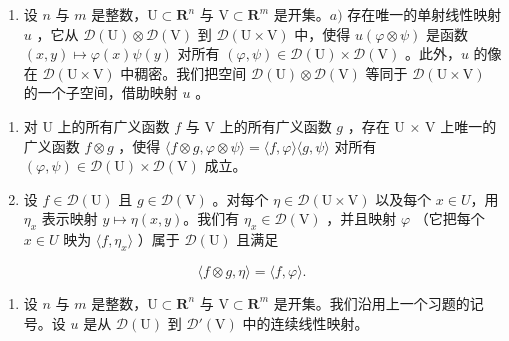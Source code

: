 \begin{enumerate}
\def\labelenumi{\arabic{enumi})}
\setcounter{enumi}{27}
\tightlist
\item
  设 \(n\) 与 \(m\) 是整数，\(\mathrm{U} \subset \mathbf{R}^n\) 与 \(\mathrm{V} \subset \mathbf{R}^m\) 是开集。\(a)\) 存在唯一的单射线性映射 \(u\) ，它从 \(\mathcal{D}(\mathrm{U}) \otimes \mathcal{D}(\mathrm{V})\) 到 \(\mathcal{D}(\mathrm{U} \times \mathrm{V})\) 中，使得 \(u(\varphi \otimes \psi)\) 是函数 \((x, y) \mapsto \varphi(x)\psi(y)\) 对所有 \((\varphi, \psi) \in \mathcal{D}(\mathrm{U}) \times \mathcal{D}(\mathrm{V})\) 。此外，\(u\) 的像在 \(\mathcal{D}(\mathrm{U} \times \mathrm{V})\) 中稠密。我们把空间 \(\mathcal{D}(\mathrm{U}) \otimes \mathcal{D}(\mathrm{V})\) 等同于 \(\mathcal{D}(\mathrm{U} \times \mathrm{V})\) 的一个子空间，借助映射 \(u\) 。
\end{enumerate}

\begin{enumerate}
\def\labelenumi{\alph{enumi})}
\setcounter{enumi}{1}
\item
  对 U 上的所有广义函数 \(f\) 与 V 上的所有广义函数 \(g\) ，存在 U × V 上唯一的广义函数 \(f \otimes g\) ，使得 \(\langle f \otimes g, \varphi \otimes \psi \rangle = \langle f, \varphi \rangle \langle g, \psi \rangle\) 对所有 \((\varphi, \psi) \in \mathcal{D}(\mathrm{U}) \times \mathcal{D}(\mathrm{V})\) 成立。
\item
  设 \(f \in \mathcal{D}(\mathrm{U})\) 且 \(g \in \mathcal{D}(\mathrm{V})\) 。对每个 \(\eta \in \mathcal{D}(\mathrm{U} \times \mathrm{V})\) 以及每个 \(x \in U\)，用 \(\eta_x\) 表示映射 \(y \mapsto \eta(x, y)\)。我们有 \(\eta_x \in \mathcal{D}(\mathrm{V})\) ，并且映射 \(\varphi\) （它把每个 \(x \in U\) 映为 \(\langle f, \eta_x \rangle\) ）属于 \(\mathcal{D}(\mathrm{U})\) 且满足
\end{enumerate}

\[
\langle f \otimes g, \eta \rangle = \langle f, \varphi \rangle .
\]

\begin{enumerate}
\def\labelenumi{\arabic{enumi})}
\setcounter{enumi}{28}
\tightlist
\item
  设 \(n\) 与 \(m\) 是整数，\(\mathrm{U} \subset \mathbf{R}^n\) 与 \(\mathrm{V} \subset \mathbf{R}^m\) 是开集。我们沿用上一个习题的记号。设 \(u\) 是从 \(\mathcal{D}(\mathrm{U})\) 到 \(\mathcal{D}'(\mathrm{V})\) 中的连续线性映射。
\end{enumerate}

